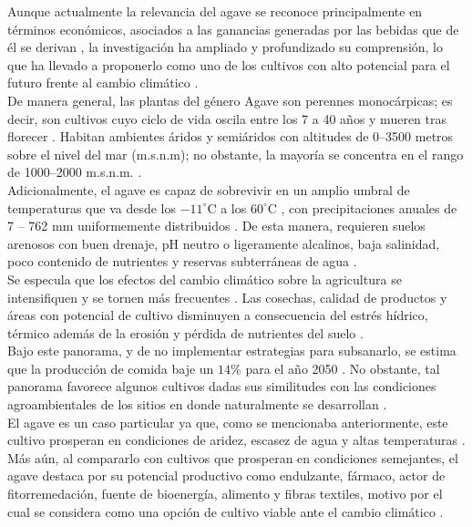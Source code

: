 Aunque actualmente la relevancia del agave se reconoce principalmente en términos económicos, asociados a las ganancias generadas por las bebidas que de él se derivan \cite{Alducin-Martinez_2023}, la investigación ha ampliado y profundizado su comprensión, lo que ha llevado a proponerlo como uno de los cultivos con alto potencial para el futuro frente al cambio climático \cite{Escamilla-Trevino_2011, Stewart_2015}.\\


De manera general, las plantas del género Agave son perennes monocárpicas; es decir, son cultivos cuyo ciclo de vida oscila entre los 7 a 40 años y mueren tras florecer \cite{Hodgson_2023}. Habitan ambientes áridos y semiáridos \cite{Honorato-Salazar_2021,Nava-Cruz_2014} con altitudes de 0--3500 metros sobre el nivel del mar (m.s.n.m); no obstante, la mayoría se concentra en el rango de 1000--2000 m.s.n.m. \cite{Honorato-Salazar_2021}.\\



Adicionalmente, el agave es capaz de sobrevivir en un amplio umbral de temperaturas que va desde los  $-11^\circ$C a los $60^\circ$C \cite{Nobel_1984}, con precipitaciones anuales de 7 -- 762 mm uniformemente distribuidos \cite{OrtizCano_2020}. De esta manera, requieren suelos arenosos con buen drenaje, pH neutro o ligeramente alcalinos, baja salinidad, poco contenido de nutrientes y reservas subterráneas de agua   \cite{Cervantes_2007,  Nava-Cruz_2014, Ortiz-Cano_2020}.\\

Se especula que los efectos del cambio climático sobre la agricultura se intensifiquen y se tornen más frecuentes \cite{Li_2025}. Las cosechas, calidad de productos y áreas con potencial de cultivo disminuyen a consecuencia del estrés hídrico, térmico además de la erosión y pérdida de nutrientes del suelo \cite{Farah_2025,Li_2025}.\\

Bajo este panorama, y de no implementar estrategias para subsanarlo, se estima que la producción de comida baje un $14\%$ para el año 2050 \cite{Farah_2025}. No obstante, tal panorama favorece algunos cultivos dadas sus similitudes con las condiciones agroambientales de los sitios en donde naturalmente se desarrollan \cite{Kopec_2024}.\\

El agave es un caso particular ya que, como se mencionaba anteriormente, este cultivo prosperan en condiciones de aridez, escasez de agua y altas temperaturas \cite{Davis_2011}. Más aún, al compararlo con cultivos que prosperan en condiciones semejantes, el agave destaca por su potencial productivo como endulzante, fármaco, actor de fitorremedación, fuente de bioenergía, alimento y fibras textiles, motivo por el cual se considera como una opción de cultivo viable ante el cambio climático  \cite{Davis_2021,Davis_2011, Davis_2023, Jimenez-Torres_2021,Phillips_2025,Stewart_2015}.\\ 



